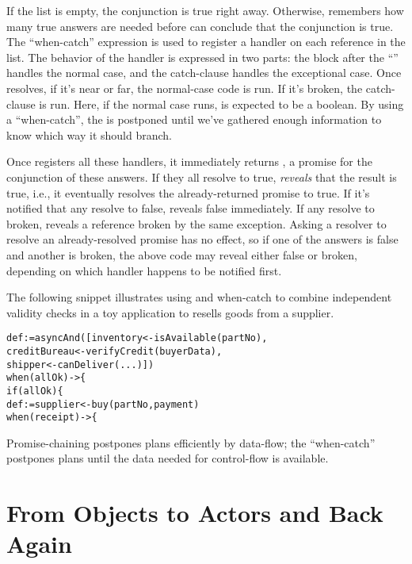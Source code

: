 \documentclass{llncs}
\begin{document}
If the list is empty, the conjunction is true right away. Otherwise,
 remembers how many true answers are needed before
 can conclude that the conjunction is true. The
``when-catch'' expression is used to register a handler on each
reference in the list. The behavior of the handler is expressed in two
parts: the block after the ``\code{->~\{}'' handles the normal case,
and the catch-clause handles the exceptional case. Once 
resolves, if it's near or far, the normal-case code is run. If it's
broken, the catch-clause is run.  Here, if the normal case runs,
 is expected to be a boolean. By using a ``when-catch'',
the  is postponed until we've gathered enough information to
know which way it should branch.

Once  registers all these handlers, it immediately
returns , a promise for the conjunction of these
answers. If they all resolve to true,  \emph{reveals}
that the result is true, i.e., it eventually resolves the
already-returned promise to true. If it's notified that any resolve to
false,  reveals false immediately. If any resolve to
broken,  reveals a reference broken by the same
exception. Asking a resolver to resolve an already-resolved promise
has no effect, so if one of the answers is false and another is broken,
the above  code may reveal either false or broken,
depending on which handler happens to be notified first.

The following snippet illustrates using  and when-catch
to combine independent validity checks in a toy application to resells
goods from a supplier.
%
\begin{alltt}
   def  := asyncAnd([inventory <- isAvailable(partNo),
                          creditBureau <- verifyCredit(buyerData),
                          shipper <- canDeliver(...)])
   when (allOk) -> \{
       if (allOk) \{
           def  := supplier <- buy(partNo, payment)
           when (receipt) -> \{
\end{alltt}
%
Promise-chaining postpones plans efficiently by data-flow; the
``when-catch'' postpones plans until the data needed for control-flow
is available.

\section{From Objects to Actors and Back Again}
\end{document}
